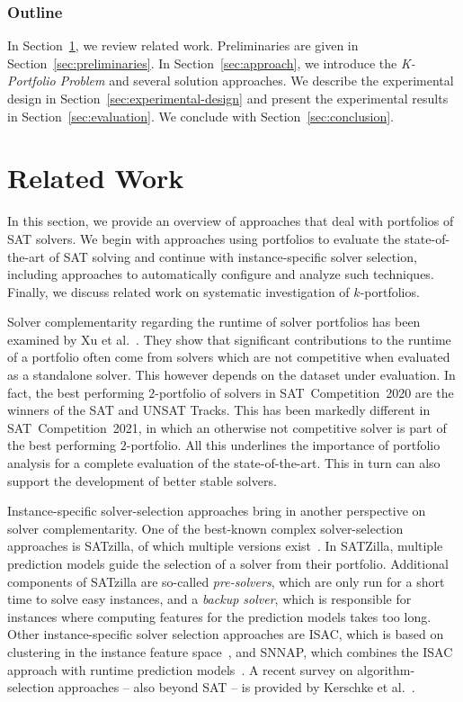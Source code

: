 \documentclass[runningheads]{llncs}
\begin{document}
\subsubsection{Outline}

In Section~\ref{sec:related-work}, we review related work. 
Preliminaries are given in Section~\ref{sec:preliminaries}. 
In Section~\ref{sec:approach}, we introduce the \emph{K-Portfolio Problem} and several solution approaches. 
We describe the experimental design in Section~\ref{sec:experimental-design} and present the experimental results in Section~\ref{sec:evaluation}. 
We conclude with Section~\ref{sec:conclusion}. 

\section{Related Work}
\label{sec:related-work}

In this section, we provide an overview of approaches that deal with portfolios of SAT solvers. 
We begin with approaches using portfolios to evaluate the state-of-the-art of SAT solving and continue with instance-specific solver selection, including approaches to automatically configure and analyze such techniques. 
Finally, we discuss related work on systematic investigation of $k$-portfolios. 

Solver complementarity regarding the runtime of solver portfolios has been examined by Xu et al.~\cite{Xu:2012:EvalContribVBS}. 
They show that significant contributions to the runtime of a portfolio often come from solvers which are not competitive when evaluated as a standalone solver. 
This however depends on the dataset under evaluation. 
In fact, the best performing $2$-portfolio of solvers in SAT~Competition~2020 are the winners of the SAT and UNSAT Tracks. 
This has been markedly different in SAT~Competition~2021, in which an otherwise not competitive solver is part of the best performing $2$-portfolio. 
All this underlines the importance of portfolio analysis for a complete evaluation of the state-of-the-art. 
This in turn can also support the development of better stable solvers.

Instance-specific solver-selection approaches bring in another perspective on solver complementarity.
One of the best-known complex solver-selection approaches is SATzilla, of which multiple versions exist~\cite{xu2008satzilla,xu2012satzilla2012}. 
In SATZilla, multiple prediction models guide the selection of a solver from their portfolio. 
Additional components of SATzilla are so-called \emph{pre-solvers}, which are only run for a short time to solve easy instances, and a \emph{backup solver}, which is responsible for instances where computing features for the prediction models takes too long.
Other instance-specific solver selection approaches are ISAC, which is based on clustering in the instance feature space~\cite{Kadioglu:2010:ISAC}, and SNNAP, which combines the ISAC approach with runtime prediction models~\cite{Collautti:2013:SNNAP}.
A recent survey on algorithm-selection approaches -- also beyond SAT -- is provided by Kerschke et al.~\cite{kerschke2019automated}.
\end{document}
